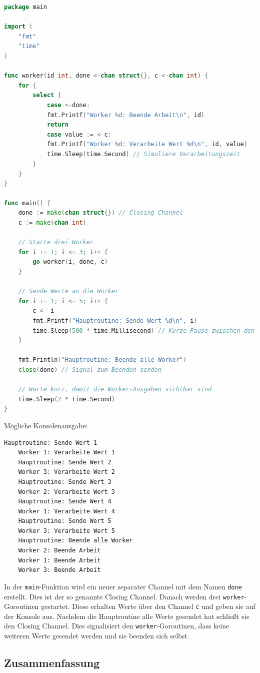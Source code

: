 \documentclass[fontsize=12pt,paper=a4,twoside=semi,parskip=half-,headsepline,headinclude]{scrreprt}
\begin{document}
\begin{lstlisting}[language=Go,extendedchars=true]
package main

import (
	"fmt"
	"time"
)

func worker(id int, done <-chan struct{}, c <-chan int) {
	for {
		select {
			case <-done:
			fmt.Printf("Worker %d: Beende Arbeit\n", id)
			return
			case value := <-c:
			fmt.Printf("Worker %d: Verarbeite Wert %d\n", id, value)
			time.Sleep(time.Second) // Simuliere Verarbeitungszeit
		}
	}
}

func main() {
	done := make(chan struct{}) // Closing Channel
	c := make(chan int)
	
	// Starte drei Worker
	for i := 1; i <= 3; i++ {
		go worker(i, done, c)
	}
	
	// Sende Werte an die Worker
	for i := 1; i <= 5; i++ {
		c <- i
		fmt.Printf("Hauptroutine: Sende Wert %d\n", i)
		time.Sleep(500 * time.Millisecond) // Kurze Pause zwischen den Sendungen
	}
	
	fmt.Println("Hauptroutine: Beende alle Worker")
	close(done) // Signal zum Beenden senden
	
	// Warte kurz, damit die Worker-Ausgaben sichtbar sind
	time.Sleep(2 * time.Second)
}
\end{lstlisting}
Mögliche Konsolenausgabe:
\begin{lstlisting}[frame=shadowbox, rulecolor=\color{black}, backgroundcolor=\color{gray!10}]
	Hauptroutine: Sende Wert 1
	Worker 1: Verarbeite Wert 1
	Hauptroutine: Sende Wert 2
	Worker 3: Verarbeite Wert 2
	Hauptroutine: Sende Wert 3
	Worker 2: Verarbeite Wert 3
	Hauptroutine: Sende Wert 4
	Worker 1: Verarbeite Wert 4
	Hauptroutine: Sende Wert 5
	Worker 3: Verarbeite Wert 5
	Hauptroutine: Beende alle Worker
	Worker 2: Beende Arbeit
	Worker 1: Beende Arbeit
	Worker 3: Beende Arbeit
\end{lstlisting}

In der \texttt{main}-Funktion wird ein neuer separater Channel mit dem Namen \texttt{done} erstellt. Dies ist der so genannte Closing Channel. Danach werden drei \texttt{worker}-Goroutinen ge\-star\-tet. Diese erhalten Werte über den Channel \texttt{c} und geben sie auf der Konsole aus. Nachdem die Hauptroutine alle Werte gesendet hat schließt sie den Closing Channel. Dies signalisiert den  \texttt{worker}-Goroutinen, dass keine weiteren Werte gesendet werden und sie beenden sich selbst.

\subsection{Zusammenfassung}
\end{document}
